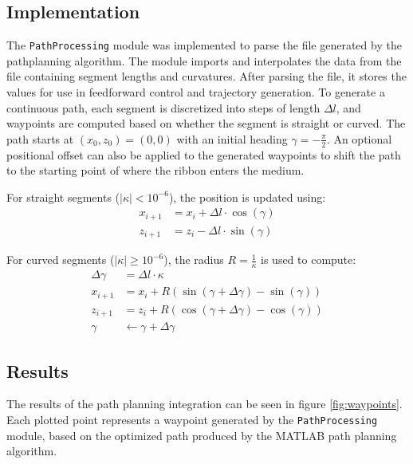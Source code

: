 \subsection{Implementation}
The \texttt{PathProcessing} module was implemented to parse the file generated by the pathplanning algorithm. The module imports and interpolates the data from the file containing segment lengths and curvatures. After parsing the file, it stores the values for use in feedforward control and trajectory generation.
\newline \newline
To generate a continuous path, each segment is discretized into steps of length \( \Delta l \), and waypoints are computed based on whether the segment is straight or curved. The path starts at \( (x_0, z_0) = (0, 0) \) with an initial heading \( \gamma = -\frac{\pi}{2} \). An optional positional offset can also be applied to the generated waypoints to shift the path to the starting point of where the ribbon enters the medium.

For straight segments (\( |\kappa| < 10^{-6} \)), the position is updated using:
\begin{align}
x_{i+1} &= x_i + \Delta l \cdot \cos(\gamma) \\
z_{i+1} &= z_i - \Delta l \cdot \sin(\gamma)
\end{align}

For curved segments (\( |\kappa| \geq 10^{-6} \)), the radius \( R = \frac{1}{\kappa} \) is used to compute:
\begin{align}
\Delta \gamma &= \Delta l \cdot \kappa \\
x_{i+1} &= x_i + R \left( \sin(\gamma + \Delta \gamma) - \sin(\gamma) \right) \\
z_{i+1} &= z_i + R \left( \cos(\gamma + \Delta \gamma) - \cos(\gamma) \right) \\
\gamma &\leftarrow \gamma + \Delta \gamma
\end{align}


\subsection{Results}
The results of the path planning integration can be seen in figure \ref{fig:waypoints}. Each plotted point represents a waypoint generated by the \texttt{PathProcessing} module, based on the optimized path produced by the MATLAB path planning algorithm.

